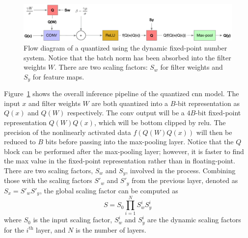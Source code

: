 \documentclass{article}
\begin{document}
%
\begin{figure}
    \centering
    \includegraphics[width=\linewidth]{quant_inference}
    \caption{Flow diagram of a  quantized using the dynamic fixed-point number system. Notice that the batch norm has been absorbed into the filter weights $W$. There are two scaling factors: $S_w$ for filter weights and $S_y$ for feature maps.}
    \label{fig:quant_inference}
\end{figure}
%
Figure~\ref{fig:quant_inference} shows the overall inference pipeline of the quantized \gls{cnn} model.
The input $x$ and filter weights $W$ are both quantized into a $B$-bit representation as $Q(x)$ and $Q(W)$ respectively.
The \gls{conv} output will be a $4B$-bit fixed-point representation $Q(W)Q(x)$, which will be bottom clipped by \gls{relu}.
The precision of the nonlinearly activated data $f(Q(W)Q(x))$ will then be reduced to $B$ bits before passing into the max-pooling layer.
Notice that the $Q$ block can be performed after the max-pooling layer; however, it is faster to find the max value in the fixed-point representation rather than in floating-point.
There are two scaling factors, $S_w$ and $S_y$, involved in the process.
Combining those with the scaling factors $S'_w$ and $S'_y$ from the previous layer, denoted as $S_x = S'_w S'_y$, the global scaling factor can be computed as
%
\begin{equation}
S = S_0 \prod_{i=1}^{N} S_w^i S_y^i
\label{eq:global_scale}
\end{equation}
%
where $S_0$ is the input scaling factor, $S_w^i$ and $S_y^i$ are the dynamic scaling factors for the $i^\text{th}$ layer, and $N$ is the number of layers.
\end{document}
